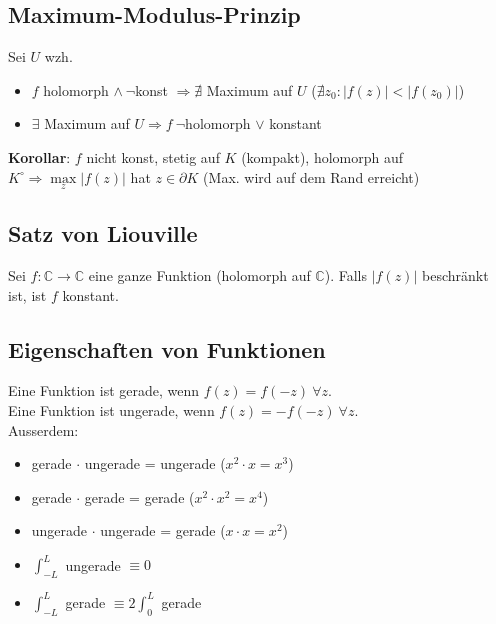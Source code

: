 \documentclass[8pt, a4paper, landscape, fleqn]{scrartcl}
\def\C{\mathbb{C}}
\newcommand{\blue}[1]{\textcolor{ethblue}{#1}}
\begin{document}
\begin{multicols*}{3}
        \subsection{Maximum-Modulus-Prinzip}
        \label{sec:max-mod}
        Sei $U$ wzh. \begin{itemize}
            \item $f$ holomorph $\land \ \lnot$konst $\Rightarrow \nexists$ Maximum auf $U$ ($\nexists z_0 : \vert f(z) \vert < \vert f(z_0) \vert$)
            \item $\exists$ Maximum auf $U\Rightarrow f\ \lnot$holomorph $\lor$ konstant 
        \end{itemize}
        \textbf{Korollar}: $f$ nicht konst, stetig auf $K$ (kompakt), holomorph auf $K^\circ \Rightarrow \underset{z}{\max} \vert f(z) \vert$ hat $z \in \partial K$ (Max. wird auf dem Rand erreicht)
        \subsection{Satz von Liouville}
        Sei $f : \C \to \C$ eine ganze Funktion (holomorph auf $\C$). Falls $\vert f(z)\vert$ beschränkt ist, ist $f$ konstant.
        
        \subsection{Eigenschaften von Funktionen}
        Eine Funktion ist \blue{gerade}, wenn $f(z) = f(-z) \ \forall z$. \\
        Eine Funktion ist \blue{ungerade}, wenn $f(z) = -f(-z) \ \forall z$. \\
        Ausserdem: \begin{itemize}
            \item gerade $\cdot$ ungerade = ungerade ($x^2\cdot x = x^3$)
            \item gerade $\cdot$ gerade = gerade ($x^2\cdot x^2 = x^4$)
            \item ungerade $\cdot$ ungerade = gerade ($x \cdot x = x^2$)
            \item $\int_{-L}^L$ ungerade $\equiv 0$
            \item $\int_{-L}^L$ gerade $\equiv 2\int_0^L$ gerade
        \end{itemize}
		
		
		
		
		
		
		
		
		

\end{multicols*}
\end{document}
